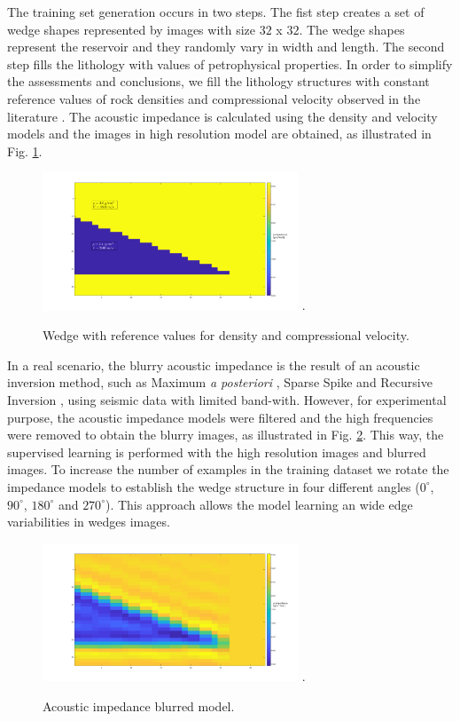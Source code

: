 \documentclass[conference,compsoc]{IEEEtran}
\begin{document}
The training set generation occurs in two steps.
The fist step creates a set of wedge shapes represented
by images with size $32$ x $32$. The wedge shapes represent the reservoir and they
randomly vary in width and length. The second step fills the lithology with values of petrophysical properties.
In order to simplify the assessments and conclusions, we fill the lithology structures with constant
reference values of rock densities and compressional velocity observed in the literature \cite{Mavko2009}.
The acoustic impedance is calculated using the density and velocity models and the images in high
resolution model are obtained, as illustrated in  Fig. \ref{fig_lithology}.
\begin{figure}[!t]
\centering
\includegraphics[width=3.0in]{Figs/Image_Paper}
\DeclareGraphicsExtensions.
\caption{Wedge with reference values for density and compressional velocity.}
\label{fig_lithology}
\end{figure}
In a real scenario, the blurry acoustic impedance is the
result of an acoustic inversion method, such as Maximum \textit{a posteriori} \cite{Buland2003,Figueiredo2012}, Sparse Spike \cite{Debeye1990} 
and Recursive Inversion \cite{Chopra2001}, using seismic data with limited band-with.
However, for experimental purpose, the acoustic impedance models were filtered
and the high frequencies were removed to obtain the blurry images, as illustrated in Fig. \ref{fig_blur}.
This way, the supervised learning is performed with the high resolution images and blurred images.
To increase the number of examples in the training dataset we rotate
the impedance models to establish the wedge structure in four different angles
($0^{\circ}$, $90^{\circ}$, $180^{\circ}$ and $270^{\circ}$).
This approach allows the model learning an wide edge variabilities
in wedges images.
\begin{figure}[!t]
\centering
\includegraphics[width=3.0in]{Figs/Image_Paper_blurred}
\DeclareGraphicsExtensions.
\caption{Acoustic impedance blurred model.}
\label{fig_blur}
\end{figure}
\end{document}
